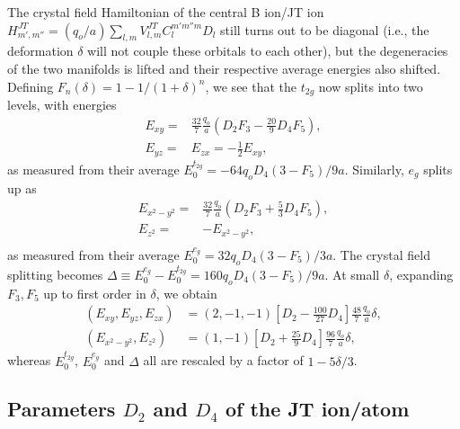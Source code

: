 \documentclass[a4paper,prb]{revtex4-1}  %
\newcommand{\com}[1]{}
\begin{document}
The crystal field Hamiltonian of the central B ion/JT ion
${H_{m',m''}^{JT} = (q_o/a)\sum_{l,m} V_{l,m}^{JT} C_{l}^{m'm''m} D_{l}}$
still turns out to be diagonal 
(i.e., the deformation $\delta$
will not couple these orbitals to each other),
but the degeneracies of the two manifolds is lifted
and their respective average energies also shifted.
Defining 
$F_n(\delta) = 1-1/(1+\delta)^n$,
we see that
the $t_{2g}$ now splits into two levels,
with energies
\begin{align}
E_{xy} =&
\frac{32}{7}\frac{q_o}{a} \left(
 D_2F_3 - \frac{20}{9}D_4F_5 
\right),\\
E_{yz} =& E_{zx} = -\frac{1}{2} E_{xy},
\end{align}
as measured from their average 
$E_0^{t_{2g}} = -64q_oD_4 \left(3-F_5\right)/9a$.
Similarly, $e_g$ splits up as
\begin{align}
E_{x^2-y^2}=&
\frac{32}{7}\frac{q_o}{a} \left(D_2F_3+\frac{5}{3} D_4F_5\right),\\
E_{z^2}=&-E_{x^2-y^2},\\
\end{align}
as measured from their average 
$E_0^{e_{g}} = 32 q_oD_4 \left(3-F_5\right)/3a$.
The crystal field splitting becomes
$\Delta \equiv E_0^{e_{g}}-E_0^{t_{2g}}=
160q_oD_4\left(3-F_5\right)/9a$.
At small $\delta$, 
expanding 
$F_3,F_5$
 up to first order in $\delta$,
we obtain
\begin{align}
\label{eq:JTt2g}
(E_{xy},E_{yz},E_{zx})&= (2, -1, -1)
\left[D_2-\frac{100}{27}  D_4\right]\frac{48}{7}\frac{q_o}{a}\delta,\\
\label{eq:JTeg}
(E_{x^2-y^2},E_{z^2})&=(1,-1)
\left[D_2+\frac{25}{9} D_4\right]\frac{96}{7}\frac{q_o}{a}\delta,
\end{align}
whereas
$E_0^{t_{2g}}$, $E_0^{e_{g}}$ and $\Delta$ all are rescaled by a factor of ${1-5\delta/3}$.


\com{
The crystal field splitting becomes
\begin{align}
E_0^{t_{2g}},E_0^{e_{g}},\Delta \to (1-\frac{5}{3}\delta)E_0^{t_{2g}}
E_0^{e_{g}} \to (1-\frac{5}{3}\delta) E_0^{e_{g}}
\Delta \to (1-\frac{5}{3}\delta)\Delta
\end{align}
}


\subsection{Parameters $D_2$ and $D_4$ of the JT ion/atom}
\end{document}
